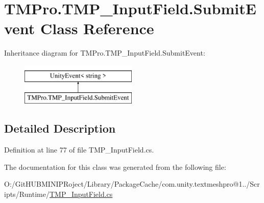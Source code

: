 \hypertarget{class_t_m_pro_1_1_t_m_p___input_field_1_1_submit_event}{}\section{T\+M\+Pro.\+T\+M\+P\+\_\+\+Input\+Field.\+Submit\+Event Class Reference}
\label{class_t_m_pro_1_1_t_m_p___input_field_1_1_submit_event}
Inheritance diagram for T\+M\+Pro.\+T\+M\+P\+\_\+\+Input\+Field.\+Submit\+Event\+:\begin{figure}[H]
\begin{center}
\leavevmode
\includegraphics[height=2.000000cm]{class_t_m_pro_1_1_t_m_p___input_field_1_1_submit_event}
\end{center}
\end{figure}


\subsection{Detailed Description}


Definition at line 77 of file T\+M\+P\+\_\+\+Input\+Field.\+cs.



The documentation for this class was generated from the following file\+:\begin{DoxyCompactItemize}
\item 
O\+:/\+Git\+H\+U\+B\+M\+I\+N\+I\+P\+Roject/\+Library/\+Package\+Cache/com.\+unity.\+textmeshpro@1../\+Scripts/\+Runtime/\mbox{\hyperlink{_t_m_p___input_field_8cs}{T\+M\+P\+\_\+\+Input\+Field.\+cs}}\end{DoxyCompactItemize}
